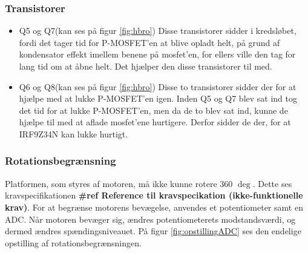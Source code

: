 \subsubsection{Transistorer}
\begin{itemize}
	\item Q5 og Q7(kan ses på figur \ref{fig:hbro})
	Disse transistorer sidder i kredsløbet, fordi det tager tid for P-MOSFET'en at blive opladt helt, på grund af kondensator effekt imellem benene på mosfet'en, for ellers ville den tag for lang tid om at åbne helt. Det hjælper den disse transistorer til med. 
	
	\item Q6 og Q8(kan ses på figur \ref{fig:hbro})
	Disse to transistorer sidder der for at hjælpe med at lukke P-MOSFET'en igen. Inden Q5 og Q7 blev sat ind tog det tid for at lukke P-MOSFET'en, men da de to blev sat ind, kunne de hjælpe til med at aflade mosfet'ene hurtigere. Derfor sidder de der, for at IRF9Z34N kan lukke hurtigt. 
\end{itemize}

\subsubsection{Rotationsbegrænsning}
Platformen, som styres af motoren, må ikke kunne rotere 360 \(\deg\). Dette ses kravspecifikationen \textbf{\#ref Reference til kravspecikation (ikke-funktionelle krav)}. For at begrænse motorens bevægelse, anvendes et potentiometer samt en ADC. Når motoren bevæger sig, ændres potentiometerets modstandsværdi, og dermed ændres spændingsniveauet. På figur \ref{fig:opstillingADC} ses den endelige opstilling af rotationsbegrænsningen.

